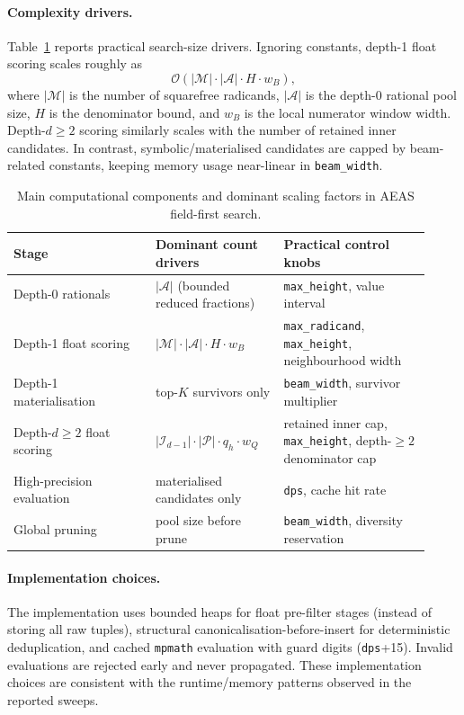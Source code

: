 \documentclass[11pt]{article}
\begin{document}
\paragraph{Complexity drivers.}
Table~\ref{tab:complexity} reports practical search-size drivers.
Ignoring constants, depth-1 float scoring scales roughly as
\[
\mathcal{O}\!\left(|\mathcal{M}| \cdot |\mathcal{A}| \cdot H \cdot w_B\right),
\]
where $|\mathcal{M}|$ is the number of squarefree radicands, $|\mathcal{A}|$ is the depth-0 rational pool size, $H$ is the denominator bound, and $w_B$ is the local numerator window width.
Depth-$d\ge 2$ scoring similarly scales with the number of retained inner candidates.
In contrast, symbolic/materialised candidates are capped by beam-related constants, keeping memory usage near-linear in \texttt{beam\_width}.

\begin{table}[t]
  \centering
  \caption{Main computational components and dominant scaling factors in AEAS field-first search.}
  \label{tab:complexity}
  \begin{tabular}{p{0.31\linewidth}p{0.29\linewidth}p{0.32\linewidth}}
    \toprule
    Stage & Dominant count drivers & Practical control knobs \\
    \midrule
    Depth-0 rationals & $|\mathcal{A}|$ (bounded reduced fractions) & \texttt{max\_height}, value interval \\
    Depth-1 float scoring & $|\mathcal{M}|\cdot|\mathcal{A}|\cdot H\cdot w_B$ & \texttt{max\_radicand}, \texttt{max\_height}, neighbourhood width \\
    Depth-1 materialisation & top-$K$ survivors only & \texttt{beam\_width}, survivor multiplier \\
    Depth-$d\ge2$ float scoring & $|\mathcal{I}_{d-1}|\cdot|\mathcal{P}|\cdot q_h\cdot w_Q$ & retained inner cap, \texttt{max\_height}, depth-$\ge2$ denominator cap \\
    High-precision evaluation & materialised candidates only & \texttt{dps}, cache hit rate \\
    Global pruning & pool size before prune & \texttt{beam\_width}, diversity reservation \\
    \bottomrule
  \end{tabular}
\end{table}

\paragraph{Implementation choices.}
The implementation uses bounded heaps for float pre-filter stages (instead of storing all raw tuples), structural canonicalisation-before-insert for deterministic deduplication, and cached \texttt{mpmath} evaluation with guard digits (\texttt{dps}+15).
Invalid evaluations are rejected early and never propagated.
These implementation choices are consistent with the runtime/memory patterns observed in the reported sweeps.
\end{document}
